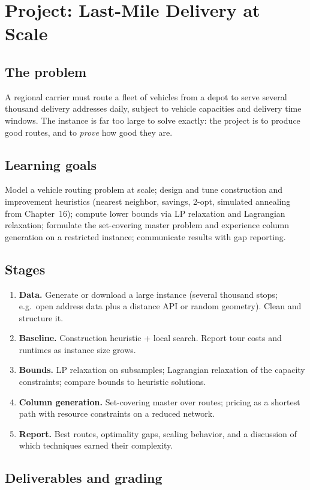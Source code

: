 \chapter{Project: Last-Mile Delivery at Scale}
\label{ch:project-delivery}


\section*{The problem}
A regional carrier must route a fleet of vehicles from a depot to serve
several thousand delivery addresses daily, subject to vehicle capacities and
delivery time windows. The instance is far too large to solve exactly: the
project is to produce good routes, and to \emph{prove} how good they are.

\section*{Learning goals}
Model a vehicle routing problem at scale; design and tune construction and
improvement heuristics (nearest neighbor, savings, 2-opt, simulated
annealing from Chapter~16); compute lower bounds via LP relaxation and
Lagrangian relaxation; formulate the set-covering master problem and
experience column generation on a restricted instance; communicate results
with gap reporting.

\section*{Stages}
\begin{enumerate}
  \item \textbf{Data.} Generate or download a large instance (several
    thousand stops; e.g.\ open address data plus a distance API or random
    geometry). Clean and structure it.
  \item \textbf{Baseline.} Construction heuristic + local search. Report
    tour costs and runtimes as instance size grows.
  \item \textbf{Bounds.} LP relaxation on subsamples; Lagrangian relaxation
    of the capacity constraints; compare bounds to heuristic solutions.
  \item \textbf{Column generation.} Set-covering master over routes;
    pricing as a shortest path with resource constraints on a reduced
    network.
  \item \textbf{Report.} Best routes, optimality gaps, scaling behavior,
    and a discussion of which techniques earned their complexity.
\end{enumerate}

\section*{Deliverables and grading}
